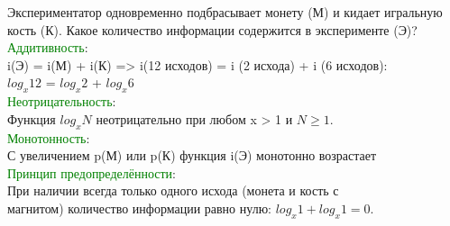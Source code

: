 \newpage
\rhead{\textbf{\textcolor{blue}{А}\textcolor{gray}{нализ свойств меры Хартли}}}
\vspace*{2mm}
\newline
Экспериментатор одновременно подбрасывает монету (М) и кидает игральную кость  (К).
Какое количество информации содержится в эксперименте (Э)?\\
\vspace*{3mm}
\textcolor{Green}{Аддитивность}:\\
\qquad i(Э) = i(М) + i(К) => i(12 исходов) = i (2 исхода) + i (6 исходов): \\
\qquad$log_x 12$ = $log_x 2$ + $log_x 6$\\
\textcolor{Green}{Неотрицательность}:\\
\qquad Функция $log_x N$ неотрицательно при любом x > 1 и $N \geq 1$. \\
\textcolor{Green}{Монотонность}:\\
\qquad С увеличением p(М) или p(К) функция i(Э) монотонно возрастает\\
\textcolor{Green}{Принцип предопределённости}:\\
\qquad При наличии всегда только одного исхода (монета и кость с \\
\qquad магнитом) количество информации равно нулю: $log_x 1 + log_x 1 = 0$.

